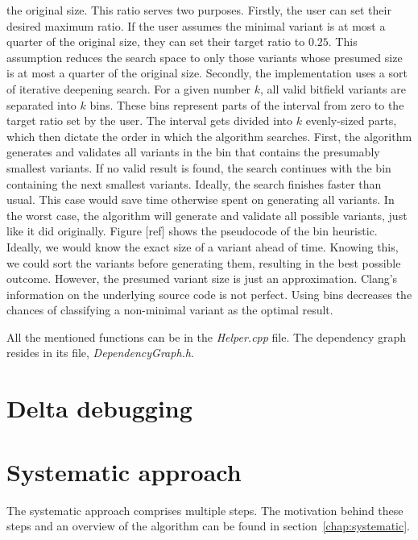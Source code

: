 the original size. 
This ratio serves two purposes. 
Firstly, the user can set their desired maximum ratio. 
If the user assumes the minimal variant is at most a quarter of 
the original size, they can set their target ratio to $0.25$. 
This assumption reduces the search space to only those variants whose 
presumed size is at most a quarter of the original size. 
Secondly, the implementation uses a sort of iterative deepening search. 
For a given number $k$, all valid bitfield variants are separated into $k$ 
bins. 
These bins represent parts of the interval from zero to the target ratio 
set by the user. 
The interval gets divided into $k$ evenly-sized parts, which then dictate 
the order in which the algorithm searches. 
First, the algorithm generates and validates all variants in the bin that 
contains the presumably smallest variants. 
If no valid result is found, the search continues with the bin containing 
the next smallest variants. 
Ideally, the search finishes faster than usual. 
This case would save time otherwise spent on generating all variants. 
In the worst case, the algorithm will generate and validate all possible 
variants, just like it did originally. 
Figure [ref] shows the pseudocode of the bin heuristic.
Ideally, we would know the exact size of a variant ahead of time. 
Knowing this, we could sort the variants before generating them, resulting 
in the best possible outcome. 
However, the presumed variant size is just an approximation. 
Clang's information on the underlying source code is not perfect. 
Using bins decreases the chances of classifying a non-minimal variant as 
the optimal result.

All the mentioned functions can be in the \emph{Helper.cpp} file. 
The dependency graph resides in its file, \emph{DependencyGraph.h}.

\section{Delta debugging}

\section{Systematic approach}


The systematic approach comprises multiple steps.
The motivation behind these steps and an overview of the algorithm can be 
found in section~\ref{chap:systematic}.

